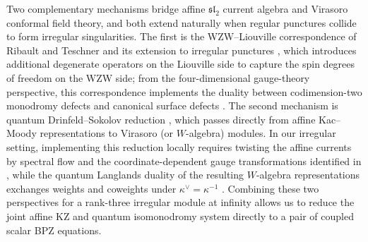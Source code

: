 \documentclass[a4paper,11pt]{article}
\numberwithin{equation}{section}
\begin{document}
Two complementary mechanisms bridge affine $\mathfrak{sl}_{2}$ current
algebra and Virasoro conformal field theory, and both extend naturally
when regular punctures collide to form irregular singularities.  The
first is the WZW--Liouville correspondence of Ribault and Teschner
\cite{RibaultTeschner2005,HikidaSchomerus2007} and its extension to
irregular punctures \cite{GaiottoLamyPoirier2013}, which introduces
additional degenerate operators on the Liouville side to capture the
spin degrees of freedom on the WZW side; from the four-dimensional
gauge-theory perspective, this correspondence implements the duality
between codimension-two monodromy defects and canonical surface defects
\cite{FrenkelGukovTeschner2015}.  The second mechanism is quantum
Drinfeld--Sokolov reduction
\cite{DrinfeldSokolov1985,FeiginFrenkel2007}, which passes directly
from affine Kac--Moody representations to Virasoro (or $W$-algebra)
modules.  In our irregular setting, implementing this reduction locally
requires twisting the affine currents by spectral flow and the
coordinate-dependent gauge transformations identified in
\cite{BanerjeeHaghighatLatifi2026}, while the quantum Langlands duality
of the resulting $W$-algebra representations exchanges weights and
coweights under $\kappa^{\vee}=\kappa^{-1}$ \cite{ArakawaFrenkel2019}.
Combining these two perspectives for a rank-three irregular module at
infinity allows us to reduce the joint affine KZ and quantum
isomonodromy system directly to a pair of coupled scalar BPZ equations.
\end{document}
